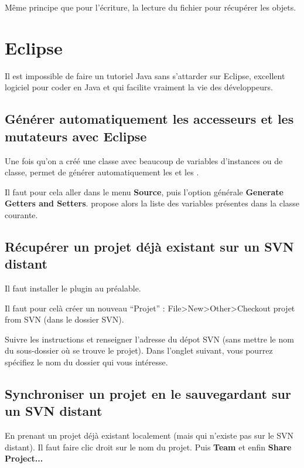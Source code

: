 \documentclass[a4paper,twoside]{article}
\begin{document}
Même principe que pour l'écriture, la lecture du fichier pour récupérer les objets. 

\section{Eclipse}
Il est impossible de faire un tutoriel Java sans s'attarder sur Eclipse, excellent logiciel pour coder en Java et qui facilite vraiment la vie des développeurs.

\subsection{Générer automatiquement les accesseurs et les mutateurs avec Eclipse}
Une fois qu'on a créé une classe avec beaucoup de variables d'instances ou de classe,  permet de générer automatiquement les  et les . 

Il faut pour cela aller dans le menu \textbf{Source}, puis l'option générale \textbf{Generate Getters and Setters}.  propose alors la liste des variables présentes dans la classe courante.

\subsection{Récupérer un projet déjà existant sur un SVN distant}
Il faut installer le plugin  au préalable.

Il faut pour celà créer un nouveau ``Projet'' : File>New>Other>Checkout projet from SVN (dans le dossier SVN).

Suivre les instructions et renseigner l'adresse du dépot SVN (sans mettre le nom du sous-dossier où se trouve le projet). Dans l'onglet suivant, vous pourrez spécifiez le nom du dossier qui vous intéresse.

\subsection{Synchroniser un projet en le sauvegardant sur un SVN distant}
En prenant un projet déjà existant localement (mais qui n'existe pas sur le SVN distant). Il faut faire clic droit sur le nom du projet. Puis \textbf{Team} et enfin \textbf{Share Project...}

\printindex
\end{document}
